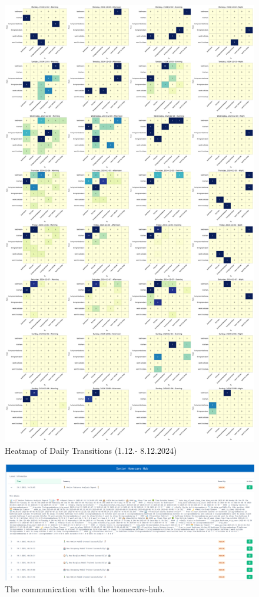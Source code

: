 \documentclass[A4,10pt]{article}
\begin{document}
\begin{figure}[H]
\begin{minipage}{0.45\textwidth}
		\includegraphics[width=\textwidth]{heatmap_days2.pdf}
		\caption{Heatmap of Daily Transitions (1.12.- 8.12.2024)}
		\label{fig:heatmap2}
	\end{minipage}
\end{figure}

\begin{figure}[H]
	\centering
	\includegraphics[width=1.1\textwidth]{homecare-hub01.png}
	\caption{The communication with the homecare-hub.}
	\label{fig:hub}
\end{figure}
\end{document}

